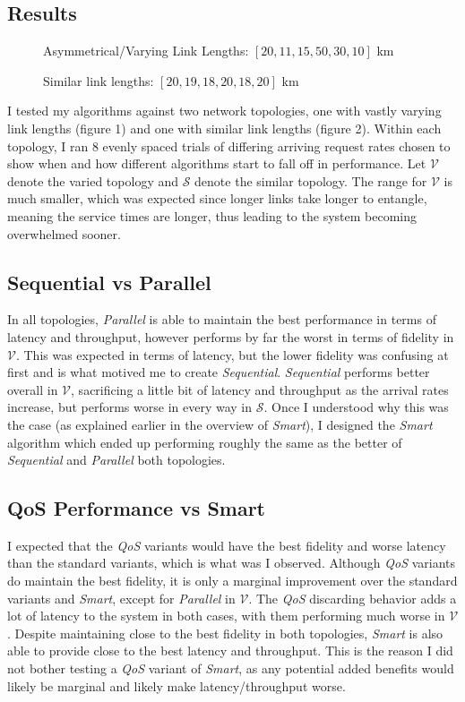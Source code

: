 \subsection{Results}
\begin{figure}[h]
    \centering
    \resizebox{1\textwidth}{!}{}
    \caption{Asymmetrical/Varying Link Lengths: $[20, 11, 15, 50, 30, 10]$ km}
\end{figure}
\begin{figure}[h]
    \centering
    \resizebox{\textwidth}{!}{}
    \caption{Similar link lengths: $[20, 19, 18, 20, 18, 20]$ km}
\end{figure}
I tested my algorithms against two network topologies, one with vastly varying link lengths (figure 1) and one with similar link lengths (figure 2).
Within each topology, I ran 8 evenly spaced trials of differing arriving request rates chosen to show when and how different algorithms start to fall off in performance.
Let $\mathcal{V}$ denote the varied topology and $\mathcal{S}$ denote the similar topology.
The range for $\mathcal{V}$ is much smaller, which was expected since longer links take longer to entangle, meaning the service times are longer, thus leading to the system becoming overwhelmed sooner.
\subsection{Sequential vs Parallel}
In all topologies, \textit{Parallel} is able to maintain the best performance in terms of latency and throughput, however performs by far the worst in terms of fidelity in $\mathcal{V}$.
This was expected in terms of latency, but the lower fidelity was confusing at first and is what motived me to create \textit{Sequential}.
\textit{Sequential} performs better overall in $\mathcal{V}$, sacrificing a little bit of latency and throughput as the arrival rates increase, but performs worse in every way in $\mathcal{S}$.
Once I understood why this was the case (as explained earlier in the overview of \textit{Smart}), I designed the \textit{Smart} algorithm which ended up performing roughly the same as the better
of \textit{Sequential} and \textit{Parallel} both topologies.
\subsection{QoS Performance vs Smart}
I expected that the \textit{QoS} variants would have the best fidelity and worse latency than the standard variants, which is what was I observed.
Although \textit{QoS} variants do maintain the best fidelity, it is only a marginal improvement over the standard variants and \textit{Smart}, except for \textit{Parallel} in $\mathcal{V}$.
The \textit{QoS} discarding behavior adds a lot of latency to the system in both cases, with them performing much worse in $\mathcal{V}$.
Despite maintaining close to the best fidelity in both topologies, \textit{Smart} is also able to provide close to the best latency and throughput.
This is the reason I did not bother testing a \textit{QoS} variant of \textit{Smart}, as any potential added benefits would likely be marginal and likely make latency/throughput worse.
